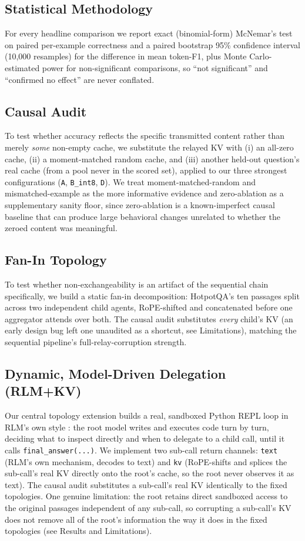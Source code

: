 \documentclass[11pt]{article}
\begin{document}
\subsection{Statistical Methodology}
For every headline comparison we report exact (binomial-form) McNemar's
test on paired per-example correctness and a paired bootstrap 95\%
confidence interval (10,000 resamples) for the difference in mean
token-F1, plus Monte Carlo-estimated power for non-significant
comparisons, so ``not significant'' and ``confirmed no effect'' are never
conflated.

\subsection{Causal Audit}
\label{sec:causal_audit_method}
To test whether accuracy reflects the specific transmitted content rather
than merely \emph{some} non-empty cache, we substitute the relayed KV
with (i) an all-zero cache, (ii) a moment-matched random cache, and (iii)
another held-out question's real cache (from a pool never in the scored
set), applied to our three strongest configurations (\texttt{A},
\texttt{B\_int8}, \texttt{D}). We treat moment-matched-random and
mismatched-example as the more informative evidence and zero-ablation as
a supplementary sanity floor, since zero-ablation is a known-imperfect
causal baseline that can produce large behavioral changes unrelated to
whether the zeroed content was meaningful.

\subsection{Fan-In Topology}
To test whether non-exchangeability is an artifact of the sequential
chain specifically, we build a static fan-in decomposition: HotpotQA's
ten passages split across two independent child agents, RoPE-shifted and
concatenated before one aggregator attends over both. The causal audit
substitutes \emph{every} child's KV (an early design bug left one
unaudited as a shortcut, see Limitations), matching the sequential
pipeline's full-relay-corruption strength.

\subsection{Dynamic, Model-Driven Delegation (RLM+KV)}
Our central topology extension builds a real, sandboxed Python REPL loop
in RLM's own style \citep{rlm2026}: the root model writes and executes
code turn by turn, deciding what to inspect directly and when to delegate
to a child call, until it calls \texttt{final\_answer(...)}. We implement
two sub-call return channels: \texttt{text} (RLM's own mechanism, decodes
to text) and \texttt{kv} (RoPE-shifts and splices the sub-call's real KV
directly onto the root's cache, so the root never observes it as text).
The causal audit substitutes a sub-call's real KV identically to the
fixed topologies. One genuine limitation: the root retains direct
sandboxed access to the original passages independent of any sub-call, so
corrupting a sub-call's KV does not remove all of the root's information
the way it does in the fixed topologies (see Results and Limitations).
\end{document}
